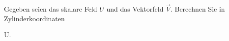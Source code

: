 \begin{atiTask}[
  title = Differentialoperatoren in Zylinderkoordinaten
]

Gegeben seien das skalare Feld $U$ und das Vektorfeld $\vec{V}$. Berechnen Sie in Zylinderkoordinaten
\begin{atiSubequations}
	 \item{\divergence {}}
	 \item{\Delta U.}
\end{atiSubequations}



\end{atiTask}

% 	
